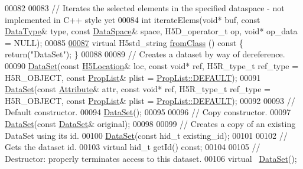 \begin{DoxyCode}
00082 
00083         \textcolor{comment}{// Iterates the selected elements in the specified dataspace - not implemented in C++ style yet}
00084         \textcolor{keywordtype}{int} iterateElems(\textcolor{keywordtype}{void}* buf, \textcolor{keyword}{const} \hyperlink{class_h5_1_1_data_type}{DataType}& type, \textcolor{keyword}{const} 
      \hyperlink{class_h5_1_1_data_space}{DataSpace}& space, H5D\_operator\_t op, \textcolor{keywordtype}{void}* op\_data = NULL);
00085 
\hyperlink{class_h5_1_1_data_set_a82b132213ea66c345e0533c34a0bd4c1}{00087}         \textcolor{keyword}{virtual} H5std\_string \hyperlink{class_h5_1_1_data_set_a82b132213ea66c345e0533c34a0bd4c1}{fromClass} ()\textcolor{keyword}{ const }\{ \textcolor{keywordflow}{return}(\textcolor{stringliteral}{"DataSet"}); \}
00088 
00089         \textcolor{comment}{// Creates a dataset by way of dereference.}
00090         \hyperlink{class_h5_1_1_data_set}{DataSet}(\textcolor{keyword}{const} \hyperlink{class_h5_1_1_h5_location}{H5Location}& loc, \textcolor{keyword}{const} \textcolor{keywordtype}{void}* ref, H5R\_type\_t ref\_type = H5R\_OBJECT, \textcolor{keyword}{
      const} \hyperlink{class_h5_1_1_prop_list}{PropList}& plist = \hyperlink{class_h5_1_1_prop_list_ae52af66ce82af0ea7e6dc57148c56241}{PropList::DEFAULT});
00091         \hyperlink{class_h5_1_1_data_set}{DataSet}(\textcolor{keyword}{const} \hyperlink{class_h5_1_1_attribute}{Attribute}& attr, \textcolor{keyword}{const} \textcolor{keywordtype}{void}* ref, H5R\_type\_t ref\_type = H5R\_OBJECT, \textcolor{keyword}{
      const} \hyperlink{class_h5_1_1_prop_list}{PropList}& plist = \hyperlink{class_h5_1_1_prop_list_ae52af66ce82af0ea7e6dc57148c56241}{PropList::DEFAULT});
00092 
00093         \textcolor{comment}{// Default constructor.}
00094         \hyperlink{class_h5_1_1_data_set}{DataSet}();
00095 
00096         \textcolor{comment}{// Copy constructor.}
00097         \hyperlink{class_h5_1_1_data_set}{DataSet}(\textcolor{keyword}{const} \hyperlink{class_h5_1_1_data_set}{DataSet}& original);
00098 
00099         \textcolor{comment}{// Creates a copy of an existing DataSet using its id.}
00100         \hyperlink{class_h5_1_1_data_set}{DataSet}(\textcolor{keyword}{const} hid\_t existing\_id);
00101 
00102         \textcolor{comment}{// Gets the dataset id.}
00103         \textcolor{keyword}{virtual} hid\_t getId() \textcolor{keyword}{const};
00104 
00105         \textcolor{comment}{// Destructor: properly terminates access to this dataset.}
00106         \textcolor{keyword}{virtual} ~\hyperlink{class_h5_1_1_data_set}{DataSet}();

\end{DoxyCode}
